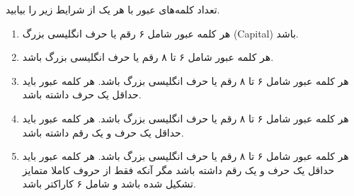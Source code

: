 \begin{PROBLEM}
    \p
    تعداد کلمه‌های عبور با هر یک از شرایط زیر را بیابید.

    \begin{enumerate}
        \item 
        هر کلمه عبور شامل ۶ رقم یا حرف انگلیسی بزرگ
        (Capital)
        باشد.

        \item 
        هر کلمه عبور شامل ۶ تا ۸ رقم یا حرف انگلیسی بزرگ باشد.
        
        \item 
        هر کلمه عبور شامل ۶ تا ۸ رقم یا حرف انگلیسی بزرگ باشد. هر کلمه عبور باید حداقل
        یک حرف داشته باشد.

        \item 
        هر کلمه عبور شامل ۶ تا ۸ رقم یا حرف انگلیسی بزرگ باشد. هر کلمه عبور باید حداقل
        یک حرف و یک رقم داشته باشد.

        \item 
        هر کلمه عبور شامل ۶ تا ۸ رقم یا حرف انگلیسی بزرگ باشد. هر کلمه عبور باید حداقل
        یک حرف و یک رقم داشته باشد مگر آنکه فقط از حروف کاملا متمایز تشکیل شده باشد و شامل
        ۶ کاراکتر باشد.


\end{enumerate}
\end{PROBLEM}
